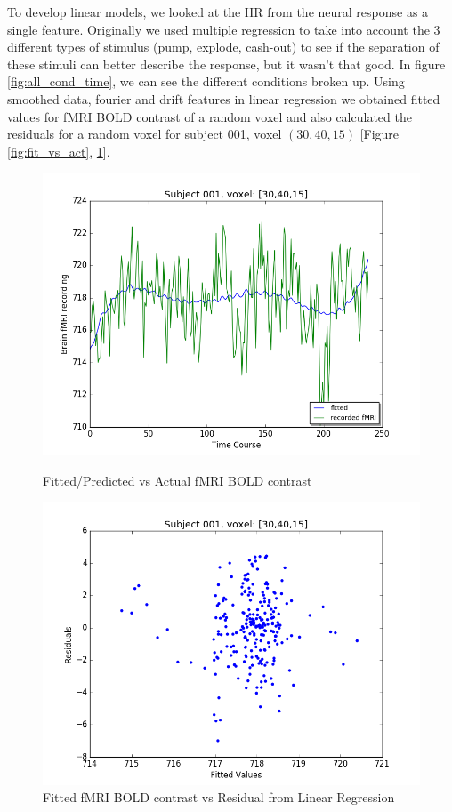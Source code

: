 
\par To develop linear models, we looked at the HR from the neural response 
as a single feature. Originally we used multiple regression to take into 
account the 3 different types of stimulus (pump, explode, cash-out) to see if 
the separation of these stimuli can better describe the response, but it wasn't 
that good. In figure \ref{fig:all_cond_time}, we can see the different 
conditions broken up. Using smoothed data, fourier and drift features in linear 
regression we obtained fitted values for fMRI BOLD contrast of a random 
voxel and also calculated the residuals for a random voxel for subject 001, 
voxel $(30,40,15)$ [Figure \ref{fig:fit_vs_act}, \ref{fig:fit_vs_res}].

  
\begin{figure}[ht]
\centering
\begin{minipage}[b]{0.45\linewidth}
	\centering
	\includegraphics[width=.8\linewidth]{../images/Fitted_v_Actual.png} 
	\caption{Fitted/Predicted vs Actual fMRI BOLD contrast}
	\label{fig:fit_vs_act}
\end{minipage}	
\quad
\begin{minipage}[b]{0.45\linewidth}
	\centering
		\includegraphics[width=.8\linewidth]{../images/Fitted_v_Residuals.png} 
	\caption{Fitted fMRI BOLD contrast vs Residual from Linear Regression}
	\label{fig:fit_vs_res}
\end{minipage}
\end{figure}




